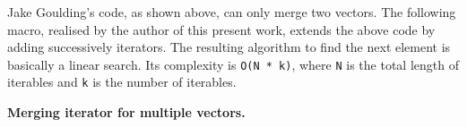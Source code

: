 \begin{Shaded}
\begin{Highlighting}[]
\AttributeTok{#[}\AttributeTok{]}
 
     \NormalTok{left  = [}\NormalTok{, }\NormalTok{, }\NormalTok{, }\NormalTok{, }\NormalTok{];}
     \NormalTok{right = [}\NormalTok{, }\NormalTok{, }\NormalTok{, }\NormalTok{];}
     \NormalTok{<_> =}

     \NormalTok{[}\NormalTok{, }\NormalTok{, }\NormalTok{, }\NormalTok{, }\NormalTok{, }\NormalTok{, }\NormalTok{, }\NormalTok{, }\NormalTok{];}
     \NormalTok{)}
    \NormalTok{);}
\NormalTok{\}}
\end{Highlighting}
\end{Shaded}

Jake Goulding's code, as shown above, can only merge two vectors. The
following macro, realised by the author of this present work, extends
the above code by adding successively iterators. The resulting algorithm
to find the next element is basically a linear search. Its complexity is
\texttt{O(N\ *\ k)}, where \texttt{N} is the total length of iterables
and \texttt{k} is the number of iterables.

\textbf{Merging iterator for multiple vectors.}

\begin{Shaded}
\begin{Highlighting}[]
 
          \NormalTok{<}
                    \NormalTok{::new($vv[}\NormalTok{].iter().map(|&i|i));}
          \NormalTok{) \{}
        \NormalTok{\};}
    \NormalTok{\}\}}
\NormalTok{\}}
\end{Highlighting}
\end{Shaded}

